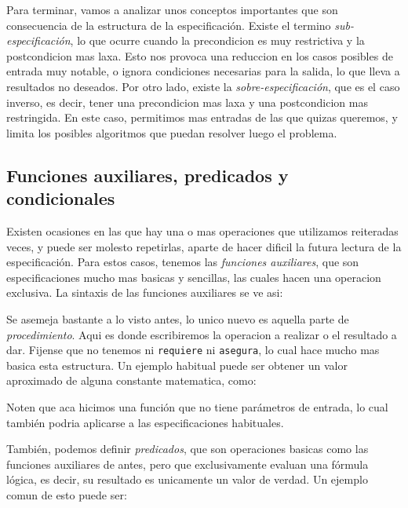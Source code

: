 \documentclass{article}
\begin{document}
Para terminar, vamos a analizar unos conceptos importantes que son consecuencia de la estructura de la especificación. Existe el termino \textit{sub-especificación}, lo que ocurre cuando la precondicion es muy restrictiva y la postcondicion mas laxa. Esto nos provoca una reduccion en los casos posibles de entrada muy notable, o ignora condiciones necesarias para la salida, lo que lleva a resultados no deseados. Por otro lado, existe la \textit{sobre-especificación}, que es el caso inverso, es decir, tener una precondicion mas laxa y una postcondicion mas restringida. En este caso, permitimos mas entradas de las que quizas queremos, y limita los posibles algoritmos que puedan resolver luego el problema.

\subsection{Funciones auxiliares, predicados y condicionales}

Existen ocasiones en las que hay una o mas operaciones que utilizamos reiteradas veces, y puede ser molesto repetirlas, aparte de hacer dificil la futura lectura de la especificación. Para estos casos, tenemos las \textit{funciones auxiliares}, que son especificaciones mucho mas basicas y sencillas, las cuales hacen una operacion exclusiva. La sintaxis de las funciones auxiliares se ve asi:

\begin{center}
\end{center}

Se asemeja bastante a lo visto antes, lo unico nuevo es aquella parte de \textit{procedimiento}. Aqui es donde escribiremos la operacion a realizar o el resultado a dar. Fijense que no tenemos ni \texttt{requiere} ni \texttt{asegura}, lo cual hace mucho mas basica esta estructura. Un ejemplo habitual puede ser obtener un valor aproximado de alguna constante matematica, como:

\begin{center}
\end{center}

Noten que aca hicimos una función que no tiene parámetros de entrada, lo cual también podria aplicarse a las especificaciones habituales.

También, podemos definir \textit{predicados}, que son operaciones basicas como las funciones auxiliares de antes, pero que exclusivamente evaluan una fórmula lógica, es decir, su resultado es unicamente un valor de verdad. Un ejemplo comun de esto puede ser:
\end{document}
